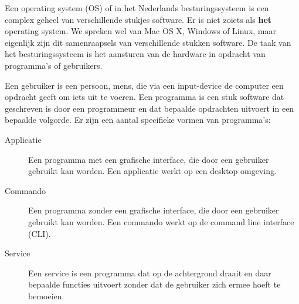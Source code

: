 Een operating system (OS) of in het Nederlands besturingssysteem is een complex geheel van verschillende stukjes software. Er is niet zoiets als \textbf{het} operating system. We spreken wel van Mac OS X, Windows of Linux, maar eigenlijk zijn dit samenraapsels van verschillende stukken software. De taak van het besturingssysteem is het aansturen van de hardware in opdracht van programma's of gebruikers.

Een gebruiker is een persoon, mens, die via een input-device de computer een opdracht geeft om iets uit te voeren. Een programma is een stuk software dat geschreven is door een programmeur en dat bepaalde opdrachten uitvoert in een bepaalde volgorde. Er zijn een aantal specifieke vormen van programma's:
\begin{description}
	\item[Applicatie] Een programma met een grafische interface, die door een gebruiker gebruikt kan worden. Een applicatie werkt op een desktop omgeving.
	\item[Commando] Een programma zonder een grafische interface, die door een gebruiker gebruikt kan worden. Een commando werkt op de command line interface (CLI).
	\item[Service] Een service is een programma dat op de achtergrond draait en daar bepaalde functies uitvoert zonder dat de gebruiker zich ermee hoeft te bemoeien.
\end{description}

